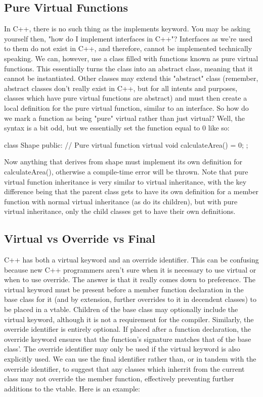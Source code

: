 \documentclass{article}
\begin{document}
\subsection{Pure Virtual Functions}

In C++, there is no such thing as the implements keyword. You may be asking yourself then, "how do I implement
interfaces in C++"? Interfaces as we’re used to them do not exist in C++, and therefore, cannot be implemented
technically speaking. We can, however, use a class filled with functions known as pure virtual functions. This
essentially turns the class into an abstract class, meaning that it cannot be instantiated. Other classes may
extend this "abstract" class (remember, abstract classes don't really exist in C++, but for all intents and
purposes, classes which have pure virtual functions are abstract) and must then create a local definition for
the pure virtual function, similar to an interface. So how do we mark a function as being "pure" virtual
rather than just virtual? Well, the syntax is a bit odd, but we essentially set the function equal to 0 like
so:

\begin{cpplst}
class Shape
{
public:
    // Pure virtual function
	virtual void calculateArea() = 0;
};
\end{cpplst}

Now anything that derives from shape must implement its own definition for calculateArea(), otherwise a
compile-time error will be thrown. Note that pure virtual function inheritance is very similar to virtual
inheritance, with the key difference being that the parent class gets to have its own definition for a member
function with normal virtual inheritance (as do its children), but with pure virtual inheritance, only the
child classes get to have their own definitions.

\subsection{Virtual vs Override vs Final}

C++ has both a virtual keyword and an override identifier. This can be confusing because new C++ programmers
aren't sure when it is necessary to use virtual or when to use override. The answer is that it really comes
down to preference. The virtual keyword must be present before a member function declaration in the base class
for it (and by extension, further overrides to it in decendent classes) to be placed in a vtable. Children of
the base class may optionally include the virtual keyword, although it is not a requirement for the compiler.
Similarly, the override identifier is entirely optional. If placed after a function declaration, the override
keyword ensures that the function's signature matches that of the base class'. The override identifier may only
be used if the virtual keyword is also explicitly used. We can use the final identifier rather than, or in
tandem with the override identifier, to suggest that any classes which inherrit from the current class may not
override the member function, effectively preventing further additions to the vtable. Here is an example:
\end{document}
